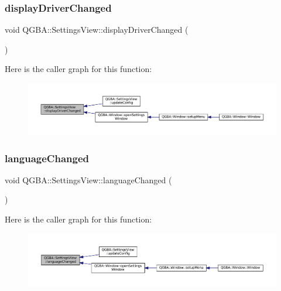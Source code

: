 \subsubsection{\texorpdfstring{display\+Driver\+Changed}{displayDriverChanged}}
{\footnotesize\ttfamily void Q\+G\+B\+A\+::\+Settings\+View\+::display\+Driver\+Changed (\begin{DoxyParamCaption}{ }\end{DoxyParamCaption})\hspace{0.3cm}{\ttfamily [signal]}}

Here is the caller graph for this function\+:
\nopagebreak
\begin{figure}[H]
\begin{center}
\leavevmode
\includegraphics[width=350pt]{class_q_g_b_a_1_1_settings_view_a64badcb415f4f6b3e7d722aba2f43b3e_icgraph}
\end{center}
\end{figure}
\mbox{\label{class_q_g_b_a_1_1_settings_view_a3589dcd1617f1a8dc6512b3afe41e7aa}} 
\subsubsection{\texorpdfstring{language\+Changed}{languageChanged}}
{\footnotesize\ttfamily void Q\+G\+B\+A\+::\+Settings\+View\+::language\+Changed (\begin{DoxyParamCaption}{ }\end{DoxyParamCaption})\hspace{0.3cm}{\ttfamily [signal]}}

Here is the caller graph for this function\+:
\nopagebreak
\begin{figure}[H]
\begin{center}
\leavevmode
\includegraphics[width=350pt]{class_q_g_b_a_1_1_settings_view_a3589dcd1617f1a8dc6512b3afe41e7aa_icgraph}
\end{center}
\end{figure}
\mbox{\label{class_q_g_b_a_1_1_settings_view_a8d85dfc8109c16b93ec7adae18f27da8}} 
